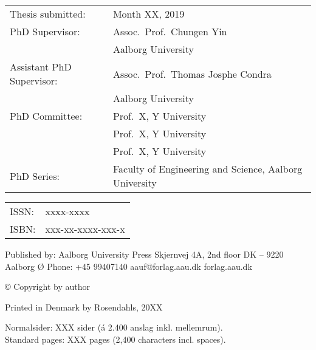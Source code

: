 \thispagestyle{empty}
\noindent
\begin{tabularx}{\textwidth}{@{}lX}
    Thesis submitted: & Month XX, 2019\\
    PhD Supervisor: &  Assoc.\ Prof.\ Chungen Yin\\
                    & Aalborg University\\
    Assistant PhD Supervisor: & Assoc.\ Prof.\ Thomas Josphe Condra\\
                    & Aalborg University\\
    PhD Committee: & Prof.\ X, Y University\\
                   & Prof.\ X, Y University\\
                   & Prof.\ X, Y University\\
    PhD Series:    & Faculty of Engineering and Science, Aalborg University\\
\end{tabularx}
\strut\vfill
\noindent
\begin{tabularx}{\textwidth}{@{}lX}
    ISSN: & xxxx-xxxx\\
    ISBN: & xxx-xx-xxxx-xxx-x\\
\end{tabularx}
\strut\vfill
\noindent Published by:\newline
Aalborg University Press\newline
Skjernvej 4A, 2nd floor\newline
DK – 9220 Aalborg Ø\newline
Phone: +45 99407140\newline
aauf@forlag.aau.dk\newline
forlag.aau.dk
\strut\vfill
\noindent \copyright{} Copyright by author\newline
\strut\vfill
\noindent Printed in Denmark by Rosendahls, 20XX
\strut\vfill\vfill\vfill
\noindent Normalsider: XXX sider (á 2.400 anslag inkl. mellemrum).\\
Standard pages: XXX pages (2,400 characters incl. spaces).
\clearpage

